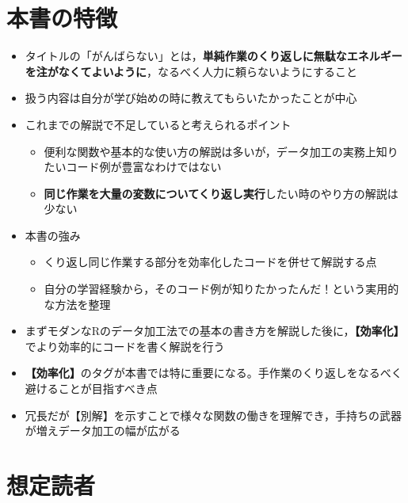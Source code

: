 \documentclass[
  xelatex,ja=standard, b5paper]{bxjsbook}
\providecommand{\tightlist}{%
  \setlength{\itemsep}{0pt}\setlength{\parskip}{0pt}}
\begin{document}
\hypertarget{ux672cux66f8ux306eux7279ux5fb4}{%
\section*{本書の特徴}\label{ux672cux66f8ux306eux7279ux5fb4}}

\begin{itemize}
\tightlist
\item
  タイトルの「がんばらない」とは，\textbf{単純作業のくり返しに無駄なエネルギーを注がなくてよいように}，なるべく人力に頼らないようにすること
\item
  扱う内容は自分が学び始めの時に教えてもらいたかったことが中心
\item
  これまでの解説で不足していると考えられるポイント

  \begin{itemize}
  \tightlist
  \item
    便利な関数や基本的な使い方の解説は多いが，データ加工の実務上知りたいコード例が豊富なわけではない
  \item
    \textbf{同じ作業を大量の変数についてくり返し実行}したい時のやり方の解説は少ない
  \end{itemize}
\item
  本書の強み

  \begin{itemize}
  \tightlist
  \item
    くり返し同じ作業する部分を効率化したコードを併せて解説する点
  \item
    自分の学習経験から，そのコード例が知りたかったんだ！という実用的な方法を整理
  \end{itemize}
\item
  まずモダンなRのデータ加工法での基本の書き方を解説した後に，\textbf{【効率化】}でより効率的にコードを書く解説を行う
\item
  \textbf{【効率化】}のタグが本書では特に重要になる。手作業のくり返しをなるべく避けることが目指すべき点
\item
  冗長だが【別解】を示すことで様々な関数の働きを理解でき，手持ちの武器が増えデータ加工の幅が広がる
\end{itemize}

\hypertarget{ux60f3ux5b9aux8aadux8005}{%
\section*{想定読者}\label{ux60f3ux5b9aux8aadux8005}}
\end{document}
